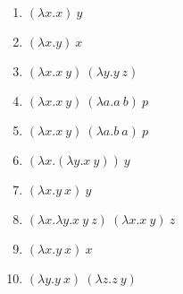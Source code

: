 \documentclass[10pt]{article}
\begin{document}
\begin{comment}
  \begin{align*}
    (\lambda x . (\lambda y . x y) z)\ (\lambda x . x y)
    \xrightarrow{\ \ \alpha\ \ }
    (\lambda x . (\lambda a . x a) z)\ (\lambda x . x y)
    \xrightarrow{\ \ \beta\ \ }
    (\lambda a . (\lambda x . x y) a) z
    \xrightarrow{\ \ \beta\ \ }
    (\lambda x . x y) z
    \xrightarrow{\ \ \beta\ \ }
    z y
  \end{align*}
\end{comment}

\begin{enumerate}
\item $(\lambda x.x)\ y$

\vfil
\item $(\lambda x.y)\ x$


\vfil
\item $(\lambda x. x\ y)\ (\lambda y. y\ z)$


\vfil
\item $(\lambda x.x\ y)\ (\lambda a. a\ b)\ p$


\vfil
\item $(\lambda x.x\ y)\ (\lambda a. b\ a)\ p$


\vfil
\item $(\lambda x.(\lambda y.x\ y))\ y$


\vfil
\item $(\lambda x.y\ x)\ y$


\vfil
\item $(\lambda x. \lambda y. x\ y\ z)\ (\lambda x. x\ y)\ z$


\vfil
\item $(\lambda x.y\ x)\ x$


\vfil
\item $(\lambda y.y\ x)\ (\lambda z. z\ y)$

\end{enumerate}
\end{document}
